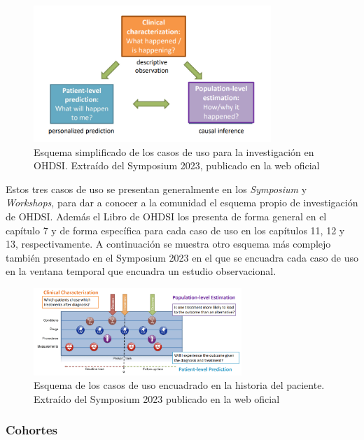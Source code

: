 \begin{figure}[H]
\centering
\includegraphics[width=0.80\textwidth]{figures/useCases.png}
     \caption{Esquema simplificado de los casos de uso para la investigación en OHDSI. Extraído del Symposium 2023, publicado en la web oficial \cite{OHDSIwebsite}}
    \label{fig:useCases}
\end{figure}

Estos tres casos de uso se presentan generalmente en los \textit{Symposium} y \textit{Workshops}, para dar a conocer a la comunidad el esquema propio de investigación de OHDSI. Además el Libro de OHDSI \cite{OHDSIbook} los presenta de forma general en el capítulo 7 y de forma específica para cada caso de uso en los capítulos 11, 12 y 13, respectivamente. A continuación se muestra otro esquema más complejo también presentado en el Symposium 2023 en el que se encuadra cada caso de uso en la ventana temporal que encuadra un estudio observacional.


\begin{figure}[H]
\centering
\includegraphics[width=0.70\textwidth]{figures/useCasesJourney.png}
     \caption{Esquema de los casos de uso encuadrado en la historia del paciente. Extraído del Symposium 2023 publicado en la web oficial \cite{OHDSIwebsite}}
    \label{fig:useCasesJourney}
\end{figure}

\subsubsection{Cohortes}

